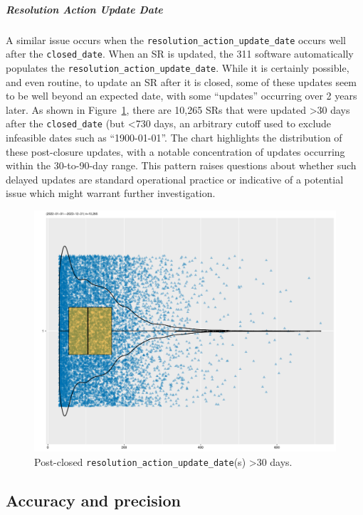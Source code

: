 \documentclass[linenumber]{jdsart}
\begin{document}
\subparagraph{Resolution Action Update Date}
A similar issue occurs when the \texttt{resolution\_action\_update\_date} occurs well after the
\texttt{closed\_date}.  When an SR is updated, the 311 software 
automatically populates the \texttt{resolution\_action\_update\_date}. 
While it is certainly possible, and even routine, to update an SR after it is closed, 
some of these updates seem to be well beyond an expected 
date, with some ``updates'' occurring over 2 years later. As shown in 
Figure~\ref{fig:resolution-violin}, there are 10,265 SRs that 
were updated >30 days after the 
\texttt{closed\_date} (but <730 days, an arbitrary cutoff used to 
exclude infeasible dates such as ``1900-01-01''. The chart 
highlights the distribution of these post-closure updates, with 
a notable concentration of updates occurring within 
the 30-to-90-day range. This pattern raises questions about whether 
such delayed updates are standard operational practice or indicative 
of a potential issue which might warrant further investigation. 

\begin{figure}[tbp]
  \centering
  \includegraphics[width=\textwidth]{post_closed_violin_chart.pdf}
  \caption{Post-closed \texttt{resolution\_action\_update\_date}(s) >30 days.}
  \label{fig:resolution-violin}
\end{figure}


	
\subsection{Accuracy and precision}
\label{sec:precision}
\end{document}
